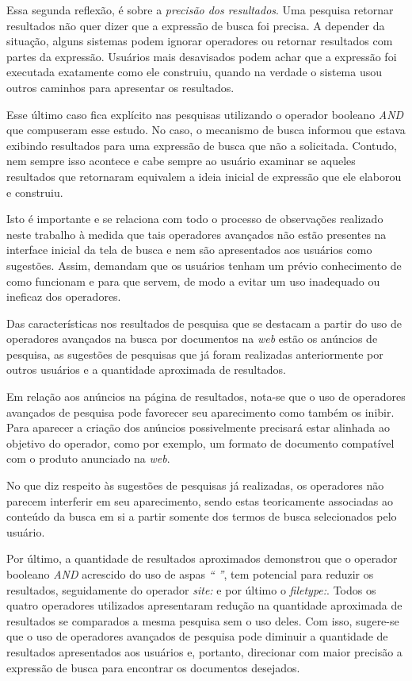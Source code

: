 \documentclass[portuguese]{textolivre}
\begin{document}
Essa segunda reflexão, é sobre a \textit{precisão dos resultados}. Uma pesquisa retornar resultados não quer dizer que a expressão de busca foi precisa. A depender da situação, alguns sistemas podem ignorar operadores ou retornar resultados com partes da expressão. Usuários mais desavisados podem achar que a expressão foi executada exatamente como ele construiu, quando na verdade o sistema usou outros caminhos para apresentar os resultados.

Esse último caso fica explícito nas pesquisas utilizando o operador booleano \textit{AND} que compuseram esse estudo. No caso, o mecanismo de busca informou que estava exibindo resultados para uma expressão de busca que não a solicitada. Contudo, nem sempre isso acontece e cabe sempre ao usuário examinar se aqueles resultados que retornaram equivalem a ideia inicial de expressão que ele elaborou e construiu.

Isto é importante e se relaciona com todo o processo de observações realizado neste trabalho à medida que tais operadores avançados não estão presentes na interface inicial da tela de busca e nem são apresentados aos usuários como sugestões. Assim, demandam que os usuários tenham um prévio conhecimento de como funcionam e para que servem, de modo a evitar um uso inadequado ou ineficaz dos operadores.

Das características nos resultados de pesquisa que se destacam a partir do uso de operadores avançados na busca por documentos na \textit{web} estão os anúncios de pesquisa, as sugestões de pesquisas que já foram realizadas anteriormente por outros usuários e a quantidade aproximada de resultados.

Em relação aos anúncios na página de resultados, nota-se que o uso de operadores avançados de pesquisa pode favorecer seu aparecimento como também os inibir. Para aparecer a criação dos anúncios possivelmente precisará estar alinhada ao objetivo do operador, como por exemplo, um formato de documento compatível com o produto anunciado na \textit{web}.

No que diz respeito às sugestões de pesquisas já realizadas, os operadores não parecem interferir em seu aparecimento, sendo estas teoricamente associadas ao conteúdo da busca em si a partir somente dos termos de busca selecionados pelo usuário.

Por último, a quantidade de resultados aproximados demonstrou que o operador booleano \textit{AND} acrescido do uso de aspas \textit{“ ”}, tem potencial para reduzir os resultados, seguidamente do operador \textit{site:} e por último o \textit{filetype:}. Todos os quatro operadores utilizados apresentaram redução na quantidade aproximada de resultados se comparados a mesma pesquisa sem o uso deles. Com isso, sugere-se que o uso de operadores avançados de pesquisa pode diminuir a quantidade de resultados apresentados aos usuários e, portanto, direcionar com maior precisão a expressão de busca para encontrar os documentos desejados.
\end{document}
